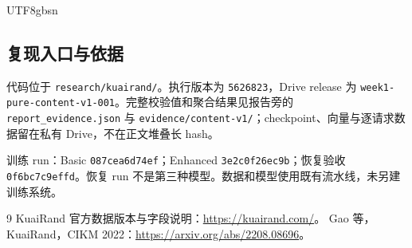 \documentclass[10pt,a4paper]{article}
\begin{document}
\begin{CJK*}{UTF8}{gbsn}
\subsection{复现入口与依据}
代码位于 \texttt{research/kuairand/}。执行版本为 \texttt{5626823}，Drive release 为 \texttt{week1-pure-content-v1-001}。完整校验值和聚合结果见报告旁的 \texttt{report\_evidence.json} 与 \texttt{evidence/content-v1/}；checkpoint、向量与逐请求数据留在私有 Drive，不在正文堆叠长 hash。

训练 run：Basic \texttt{087cea6d74ef}；Enhanced \texttt{3e2c0f26ec9b}；恢复验收 \texttt{0f6bc7c9effd}。恢复 run 不是第三种模型。数据和模型使用既有流水线，未另建训练系统。

\begin{thebibliography}{9}\small
{} KuaiRand 官方数据版本与字段说明：\url{https://kuairand.com/}。
 Gao 等，KuaiRand，CIKM 2022：\url{https://arxiv.org/abs/2208.08696}。
\end{thebibliography}
\clearpage\end{CJK*}
\end{document}
